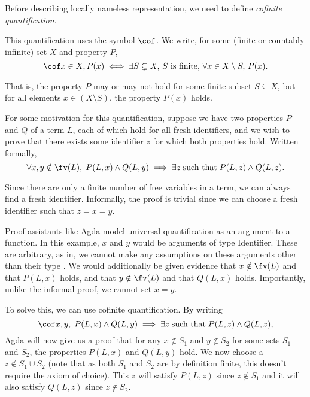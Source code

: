 Before describing locally nameless representation, we need to define \textit{cofinite
quantification}.

This quantification uses the symbol $\cof$. We write, for some (finite or countably infinite) set $X$ and property $P$,
\begin{equation}
  \label{equation:cofinite}
  \cof x \in X, P(x) \iff
  \exists S \subsetneq X, \, S \text{ is finite}, \, \forall x \in X \setminus S, \, P(x).
\end{equation}

That is, the property $P$ may or may not hold for some finite subset $S \subseteq X$, but for all
elements $x \in (X \setminus S)$, the property $P(x)$ holds.

For some motivation for this quantification, suppose we have two properties $P$ and $Q$ of a term
$L$, each of which hold for all fresh identifiers, and we wish to prove that there exists some
identifier $z$ for which both properties hold. Written formally,
\begin{equation*}
  \forall x, y \notin \fv(L), \; P(L, x) \wedge Q(L, y)
  \implies \exists z \; \text{such that} \; P(L, z) \wedge Q(L, z).
\end{equation*}

Since there are only a finite number of free variables in a term, we can always find a fresh
identifier. Informally, the proof is trivial since we can choose a fresh identifier such that $z = x
= y$.

Proof-assistants like Agda model universal quantification as an argument to a function. In this
example, $x$ and $y$ would be arguments of type Identifier. These are arbitrary, as in, we cannot
make any assumptions on these arguments other than their type
\citep[chapter~Quantifier]{wadler_programming_2022}. We would additionally be given evidence that $x
\notin \fv(L)$ and that $P(L, x)$ holds, and that $y \notin \fv(L)$ and that $Q(L, x)$ holds.
Importantly, unlike the informal proof, we cannot set $x = y$.

To solve this, we can use cofinite quantification. By writing
\begin{equation*}
  \cof x, y, \; P(L, x) \wedge Q(L, y)
  \implies \exists z \; \text{such that} \; P(L, z) \wedge Q(L, z),
\end{equation*}
Agda will now give us a proof that for any $x \notin S_1$ and $y \notin S_2$ for some sets $S_1$ and
$S_2$, the properties $P(L, x)$ and $Q(L, y)$ hold. We now choose a $z \notin S_1 \cup
S_2$ (note that as both $S_1$ and $S_2$ are by definition finite, this doesn't require the
axiom of choice). This $z$ will satisfy $P(L, z)$ since $z \notin S_1$ and it will also satisfy
$Q(L, z)$ since $z \notin S_2$.

